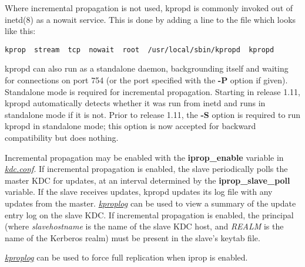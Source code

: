 \documentclass[letterpaper,10pt,english]{sphinxmanual}
\begin{document}
Where incremental propagation is not used, kpropd is commonly invoked
out of inetd(8) as a nowait service.  This is done by adding a line to
the  file which looks like this:

\begin{Verbatim}[commandchars=\\\{\}]
kprop  stream  tcp  nowait  root  /usr/local/sbin/kpropd  kpropd
\end{Verbatim}

kpropd can also run as a standalone daemon, backgrounding itself and
waiting for connections on port 754 (or the port specified with the
\textbf{-P} option if given).  Standalone mode is required for incremental
propagation.  Starting in release 1.11, kpropd automatically detects
whether it was run from inetd and runs in standalone mode if it is
not.  Prior to release 1.11, the \textbf{-S} option is required to run
kpropd in standalone mode; this option is now accepted for backward
compatibility but does nothing.

Incremental propagation may be enabled with the \textbf{iprop\_enable}
variable in {\hyperref[admin/conf_files/kdc_conf:kdc-conf-5]{\emph{kdc.conf}}}.  If incremental propagation is
enabled, the slave periodically polls the master KDC for updates, at
an interval determined by the \textbf{iprop\_slave\_poll} variable.  If the
slave receives updates, kpropd updates its log file with any updates
from the master.  {\hyperref[admin/admin_commands/kproplog:kproplog-8]{\emph{kproplog}}} can be used to view a summary of
the update entry log on the slave KDC.  If incremental propagation is
enabled, the principal  (where
\emph{slavehostname} is the name of the slave KDC host, and \emph{REALM} is the
name of the Kerberos realm) must be present in the slave's keytab
file.

{\hyperref[admin/admin_commands/kproplog:kproplog-8]{\emph{kproplog}}} can be used to force full replication when iprop is
enabled.
\end{document}
